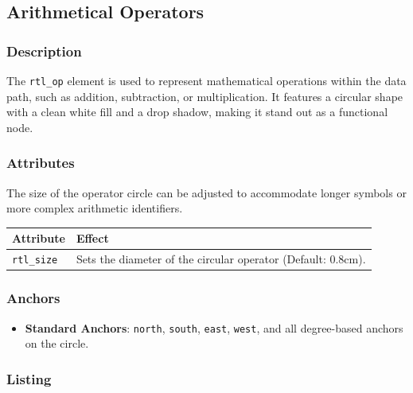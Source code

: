 \subsection{\sffamily Arithmetical Operators}

    \subsubsection{\sffamily Description}
        The \texttt{rtl\_op} element is used to represent mathematical operations within the data path, such as addition, subtraction, or multiplication. It features a circular shape with a clean white fill and a drop shadow, making it stand out as a functional node.
        
    \subsubsection{\sffamily Attributes}
        The size of the operator circle can be adjusted to accommodate longer symbols or more complex arithmetic identifiers.

    \begin{center}
        \begin{tabular}{lp{8cm}}
        \toprule
            \textbf{Attribute} & \textbf{Effect} \\
            \midrule
            \texttt{rtl\_size} & Sets the diameter of the circular operator (Default: 0.8cm). \\
            \bottomrule
        \end{tabular}
    \end{center}

    \subsubsection{\sffamily Anchors}
        \begin{itemize}
            \item \textbf{Standard Anchors}: \texttt{north}, \texttt{south}, \texttt{east}, \texttt{west}, and all degree-based anchors on the circle.
        \end{itemize}

    \subsubsection{\sffamily Listing}
\begin{RTLexample}
\end{RTLexample}

